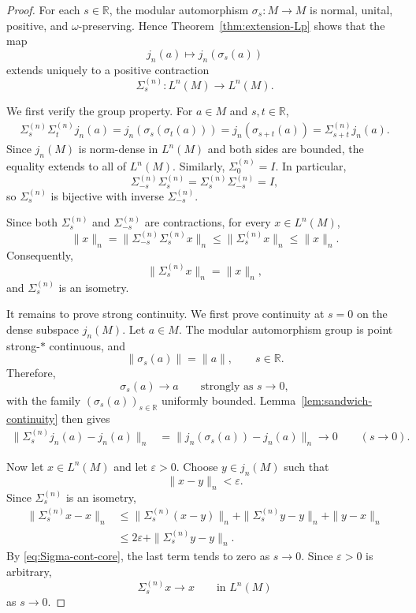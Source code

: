 \documentclass[10pt,a4paper]{amsart}
\begin{document}
\begin{proof}
For each \(s\in\mathbb R\), the modular automorphism
\(\sigma_s:M\to M\) is normal, unital, positive, and
\(\omega\)-preserving.  Hence Theorem~\ref{thm:extension-Lp} shows that the
map
\[
        j_n(a)\longmapsto j_n(\sigma_s(a))
\]
extends uniquely to a positive contraction
\[
        \Sigma_s^{(n)}:L^n(M)\longrightarrow L^n(M).
\]

We first verify the group property.  For \(a\in M\) and \(s,t\in\mathbb R\),
\[
\begin{aligned}
        \Sigma_s^{(n)}\Sigma_t^{(n)}j_n(a)=
        j_n(\sigma_s(\sigma_t(a)))  =
        j_n(\sigma_{s+t}(a)) =
        \Sigma_{s+t}^{(n)}j_n(a).
\end{aligned}
\]
Since \(j_n(M)\) is norm-dense in \(L^n(M)\) and both sides are bounded,
the equality extends to all of \(L^n(M)\).  Similarly,
\(\Sigma_0^{(n)}=I\).  In particular,
\[
        \Sigma_{-s}^{(n)}\Sigma_s^{(n)}
        =
        \Sigma_s^{(n)}\Sigma_{-s}^{(n)}
        =
        I,
\]
so \(\Sigma_s^{(n)}\) is bijective with inverse
\(\Sigma_{-s}^{(n)}\).

Since both \(\Sigma_s^{(n)}\) and \(\Sigma_{-s}^{(n)}\) are contractions,
for every \(x\in L^n(M)\),
\[
        \|x\|_n
        =
        \|\Sigma_{-s}^{(n)}\Sigma_s^{(n)}x\|_n
        \leq
        \|\Sigma_s^{(n)}x\|_n
        \leq
        \|x\|_n.
\]
Consequently,
\[
        \|\Sigma_s^{(n)}x\|_n=\|x\|_n,
\]
and \(\Sigma_s^{(n)}\) is an isometry.

It remains to prove strong continuity.  We first prove continuity at
\(s=0\) on the dense subspace \(j_n(M)\).  Let \(a\in M\).  The modular
automorphism group is point strong-\(*\) continuous, and
\[
        \|\sigma_s(a)\|=\|a\|,
        \qquad s\in\mathbb R.
\]
Therefore,
\[
        \sigma_s(a)\longrightarrow a
        \qquad\text{strongly as }s\to0,
\]
with the family \((\sigma_s(a))_{s\in\mathbb R}\) uniformly bounded.
Lemma~\ref{lem:sandwich-continuity} then gives
\begin{equation}
\label{eq:Sigma-cont-core}
\begin{aligned}
        \|\Sigma_s^{(n)}j_n(a)-j_n(a)\|_n
        &=
        \|j_n(\sigma_s(a))-j_n(a)\|_n
        \longrightarrow0
        \qquad (s\to0).
\end{aligned}
\end{equation}

Now let \(x\in L^n(M)\) and let \(\varepsilon>0\).  Choose
\(y\in j_n(M)\) such that
\[
        \|x-y\|_n<\varepsilon.
\]
Since \(\Sigma_s^{(n)}\) is an isometry,
\[
\begin{aligned}
        \|\Sigma_s^{(n)}x-x\|_n
        &\leq
        \|\Sigma_s^{(n)}(x-y)\|_n
        +
        \|\Sigma_s^{(n)}y-y\|_n
        +
        \|y-x\|_n                                    \\
        &\leq
        2\varepsilon
        +
        \|\Sigma_s^{(n)}y-y\|_n.
\end{aligned}
\]
By \eqref{eq:Sigma-cont-core}, the last term tends to zero as \(s\to0\).
Since \(\varepsilon>0\) is arbitrary,
\[
        \Sigma_s^{(n)}x\longrightarrow x
        \qquad\text{in }L^n(M)
\]
as \(s\to0\).


\end{proof}
\end{document}
